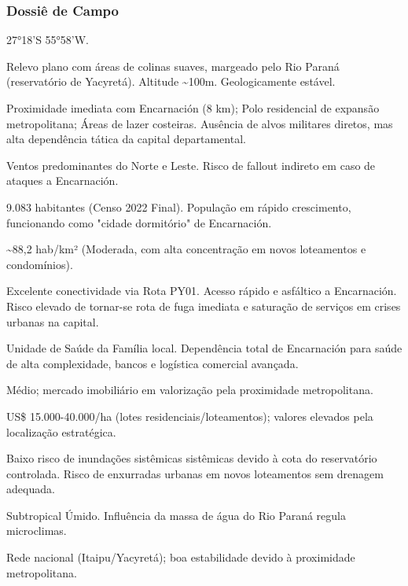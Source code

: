 \subsubsection{Dossiê de Campo}
\begin{description}[style=nextline,leftmargin=0.5cm,font=\bfseries]
\item[Coordenadas]  27°18'S 55°58'W.
\item[Topografia]  Relevo plano com áreas de colinas suaves, margeado pelo Rio Paraná (reservatório de Yacyretá). Altitude \textasciitilde 100m. Geologicamente estável.
\item[Alvos Estratégicos]  Proximidade imediata com Encarnación (8 km); Polo residencial de expansão metropolitana; Áreas de lazer costeiras. Ausência de alvos militares diretos, mas alta dependência tática da capital departamental.
\item[Fallout]  Ventos predominantes do Norte e Leste. Risco de fallout indireto em caso de ataques a Encarnación.
\item[População]  9.083 habitantes (Censo 2022 Final). População em rápido crescimento, funcionando como "cidade dormitório" de Encarnación.
\item[Densidade]  \textasciitilde 88,2 hab/\allowbreak km² (Moderada, com alta concentração em novos loteamentos e condomínios).
\item[Vias de Acesso]  Excelente conectividade via Rota PY01. Acesso rápido e asfáltico a Encarnación. Risco elevado de tornar-se rota de fuga imediata e saturação de serviços em crises urbanas na capital.
\item[Serviços]  Unidade de Saúde da Família local. Dependência total de Encarnación para saúde de alta complexidade, bancos e logística comercial avançada.
\item[Custo de Vida]  Médio; mercado imobiliário em valorização pela proximidade metropolitana.
\item[Preço da Terra]  US\$ 15.000-40.000/\allowbreak ha (lotes residenciais/\allowbreak loteamentos); valores elevados pela localização estratégica.
\item[Hidrologia]  Baixo risco de inundações sistêmicas sistêmicas devido à cota do reservatório controlada. Risco de enxurradas urbanas em novos loteamentos sem drenagem adequada.
\item[Clima]  Subtropical Úmido. Influência da massa de água do Rio Paraná regula microclimas.
\item[Energia]  Rede nacional (Itaipu/\allowbreak Yacyretá); boa estabilidade devido à proximidade metropolitana.

\end{description}
